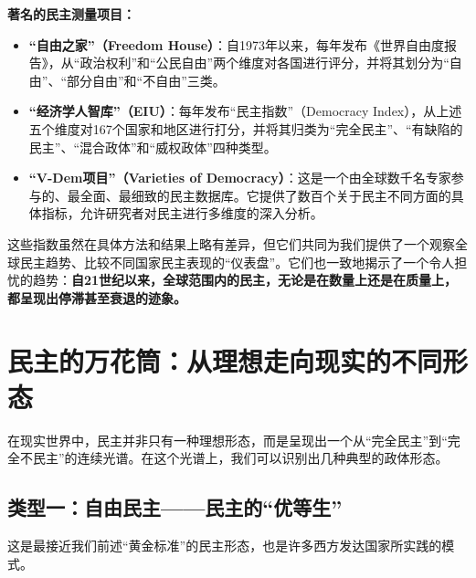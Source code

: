 \textbf{著名的民主测量项目：}

\begin{itemize}
    \item \textbf{“自由之家”（Freedom House）}：自1973年以来，每年发布《世界自由度报告》，从“政治权利”和“公民自由”两个维度对各国进行评分，并将其划分为“自由”、“部分自由”和“不自由”三类。
    \item \textbf{“经济学人智库”（EIU）}：每年发布“民主指数”（Democracy Index），从上述五个维度对167个国家和地区进行打分，并将其归类为“完全民主”、“有缺陷的民主”、“混合政体”和“威权政体”四种类型。
    \item \textbf{“V-Dem项目”（Varieties of Democracy）}：这是一个由全球数千名专家参与的、最全面、最细致的民主数据库。它提供了数百个关于民主不同方面的具体指标，允许研究者对民主进行多维度的深入分析。
\end{itemize}

这些指数虽然在具体方法和结果上略有差异，但它们共同为我们提供了一个观察全球民主趋势、比较不同国家民主表现的“仪表盘”。它们也一致地揭示了一个令人担忧的趋势：\textbf{自21世纪以来，全球范围内的民主，无论是在数量上还是在质量上，都呈现出停滞甚至衰退的迹象。}

\hrulefill

\section{民主的万花筒：从理想走向现实的不同形态}

在现实世界中，民主并非只有一种理想形态，而是呈现出一个从“完全民主”到“完全不民主”的连续光谱。在这个光谱上，我们可以识别出几种典型的政体形态。

\subsection{类型一：自由民主——民主的“优等生”}

这是最接近我们前述“黄金标准”的民主形态，也是许多西方发达国家所实践的模式。

